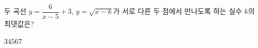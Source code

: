 \hspace*{2mm}\begin{minipage}[t]{\dimexpr\linewidth-2mm\relax}\vspace{0pt}
두 곡선 $y=\dfrac{6}{x-5}+3$, $y=\sqrt{x-k}$가 서로 다른 두 점에서 만나도록 하는 실수 $k$의 최댓값은?
\begin{choices32}{$3$}{$4$}{$5$}{$6$}{$7$}\end{choices32}\end{minipage}
